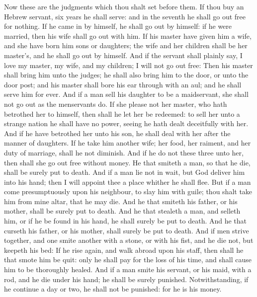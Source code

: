 \begin{biblechapter} %
\verse Now these are the judgments which thou shalt set before them.
 If thou buy an Hebrew servant, six years he shall serve: and in the seventh he shall go out free for nothing.
\verse If he came in by himself, he shall go out by himself: if he were married, then his wife shall go out with him.
\verse If his master have given him a wife, and she have born him sons or daughters; the wife and her children shall be her master's, and he shall go out by himself.
\verse And if the servant shall plainly say, I love my master, my wife, and my children; I will not go out free:
\verse Then his master shall bring him unto the judges; he shall also bring him to the door, or unto the door post; and his master shall bore his ear through with an aul; and he shall serve him for ever.
\verse And if a man sell his daughter to be a maidservant, she shall not go out as the menservants do.
\verse If she please not her master, who hath betrothed her to himself, then shall he let her be redeemed: to sell her unto a strange nation he shall have no power, seeing he hath dealt deceitfully with her.
\verse And if he have betrothed her unto his son, he shall deal with her after the manner of daughters.
\verse If he take him another wife; her food, her raiment, and her duty of marriage, shall he not diminish.
\verse And if he do not these three unto her, then shall she go out free without money.
 He that smiteth a man, so that he die, shall be surely put to death.
\verse And if a man lie not in wait, but God deliver him into his hand; then I will appoint thee a place whither he shall flee.
\verse But if a man come presumptuously upon his neighbour, to slay him with guile; thou shalt take him from mine altar, that he may die.
\verse And he that smiteth his father, or his mother, shall be surely put to death.
\verse And he that stealeth a man, and selleth him, or if he be found in his hand, he shall surely be put to death.
\verse And he that curseth his father, or his mother, shall surely be put to death.
\verse And if men strive together, and one smite another with a stone, or with his fist, and he die not, but keepeth his bed:
\verse If he rise again, and walk abroad upon his staff, then shall he that smote him be quit: only he shall pay for the loss of his time, and shall cause him to be thoroughly healed.
\verse And if a man smite his servant, or his maid, with a rod, and he die under his hand; he shall be surely punished.
\verse Notwithstanding, if he continue a day or two, he shall not be punished: for he is his money.

\end{biblechapter}
